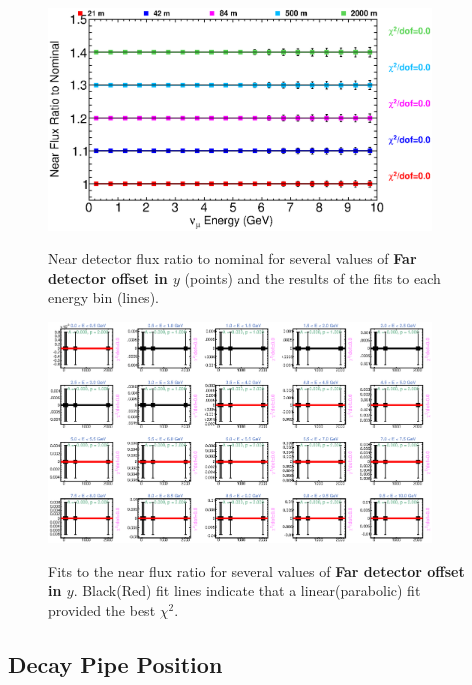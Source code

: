 \begin{figure}[ht]
  \begin{center}
    {\includegraphics[width=4.0in]{figures/LBNEFDY_near_summary.eps}}
  \end{center}
\caption{ Near detector flux ratio to nominal for several values of {\bf Far detector offset in $y$} (points) and the results of the fits to each energy bin (lines).}
\end{figure}

\begin{figure}[hb]
  \begin{center}
    {\includegraphics[width=4.0in]{figures/LBNEFDY_near_fits.eps}}
  \end{center}
\caption{ Fits to the near flux ratio for several values of {\bf Far detector offset in $y$}. Black(Red) fit lines indicate that a linear(parabolic) fit provided the best $\chi^2$. }
\end{figure}

\clearpage
\subsection{Decay Pipe Position}

